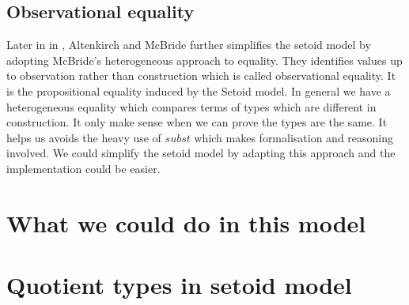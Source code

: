 


\subsection{Observational equality}


Later in in \cite{alti:ott-conf}, Altenkirch and McBride further
simplifies the setoid model by adopting McBride's heterogeneous
approach to equality. They identifies values up to observation rather than
  construction which is called observational equality. It is the
  propositional equality induced by the Setoid model.  In general we have a heterogeneous equality which
  compares terms of types which are different in construction. It only
  make sense when we can prove the types are the same. It helps us
  avoids the heavy use of $subst$ which makes formalisation and
  reasoning involved. We could simplify the setoid model by adapting this
  approach and the implementation could be easier.



\section{What we could do in this model}

\section{Quotient types in setoid model}

